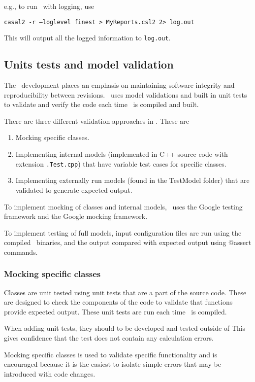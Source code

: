 e.g., to run \CNAME\ with logging, use 

\texttt{casal2 -r --loglevel finest > MyReports.csl2 2> log.out}

This will output all the logged information to \texttt{log.out}.

\subsection{Units tests and model validation}

The \CNAME\ development places an emphasis on maintaining software integrity and reproducibility between revisions. \CNAME\ uses model validations and built in unit tests to validate and verify the code each time \CNAME\ is compiled and built. 

There are three different validation approaches in \CNAME. These are 
\begin{enumerate}
	\item Mocking specific classes.
	\item Implementing internal models (implemented in C++ source code with extension \texttt{.Test.cpp}) that have variable test cases for specific classes. 
	\item Implementing externally run models (found in the TestModel folder) that are validated to generate expected output.
\end{enumerate}

To implement mocking of classes and internal models, \CNAME\ uses the Google testing framework and the Google mocking framework.

To implement testing of full models, input configuration files are run using the compiled \CNAME\ binaries, and the output compared with expected output using @assert commands.

\subsubsection{Mocking specific classes}

Classes are unit tested using unit tests that are a part of the source code. These are designed to check the components of the code to validate that functions provide expected output. These unit tests are run each time \CNAME\ is compiled.

When adding unit tests, they should to be developed and tested outside of \CNAME\. This gives confidence that the test does not contain any calculation errors. 

Mocking specific classes is used to validate specific functionality and is encouraged because it is the easiest to isolate simple errors that may be introduced with code changes. 

